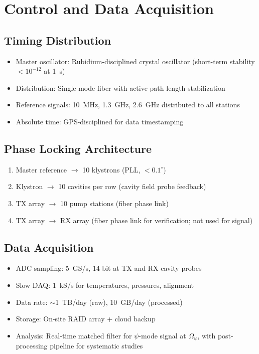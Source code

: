 \documentclass[11pt,letterpaper]{article}
\begin{document}
\section{Control and Data Acquisition}

\subsection{Timing Distribution}

\begin{itemize}
\item Master oscillator: Rubidium-disciplined crystal oscillator
(short-term stability $< 10^{-12}$ at 1~s)
\item Distribution: Single-mode fiber with active path length
stabilization
\item Reference signals: 10~MHz, 1.3~GHz, 2.6~GHz distributed
to all stations
\item Absolute time: GPS-disciplined for data timestamping
\end{itemize}

\subsection{Phase Locking Architecture}

\begin{enumerate}
\item Master reference $\rightarrow$ 10 klystrons (PLL, $< 0.1^\circ$)
\item Klystron $\rightarrow$ 10 cavities per row (cavity field probe feedback)
\item TX array $\rightarrow$ 10 pump stations (fiber phase link)
\item TX array $\rightarrow$ RX array (fiber phase link for
verification; not used for signal)
\end{enumerate}

\subsection{Data Acquisition}

\begin{itemize}
\item ADC sampling: 5~GS/s, 14-bit at TX and RX cavity probes
\item Slow DAQ: 1~kS/s for temperatures, pressures, alignment
\item Data rate: $\sim$1~TB/day (raw), 10~GB/day (processed)
\item Storage: On-site RAID array + cloud backup
\item Analysis: Real-time matched filter for $\psi$-mode signal
at $\Omega_\psi$, with post-processing pipeline for systematic
studies
\end{itemize}
\end{document}
